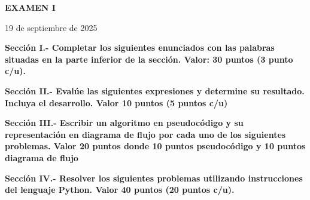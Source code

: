 \documentclass[10pt,addpoints]{exam}
\begin{document}
\begin{center}
  \sffamily\textbf{EXAMEN I}
\end{center}
\begin{flushright}
19 de septiembre de 2025
\end{flushright}

\begin{questions}
\begin{EnvFullwidth}
  \sffamily\textbf{Sección I.- Completar los siguientes enunciados con las
  palabras situadas en la parte inferior de la sección. Valor: 30 puntos
  (3 punto c/u).}
\end{EnvFullwidth}













\end{questions}

\begin{questions}
\begin{EnvFullwidth}
  \sffamily\textbf{Sección II.- Evalúe las siguientes expresiones y
  determine su resultado. Incluya el desarrollo. Valor 10 puntos (5 puntos
  c/u)}
\end{EnvFullwidth}





\end{questions}

\newpage

\begin{questions}
\begin{EnvFullwidth}
  \sffamily\textbf{Sección III.- Escribir un algoritmo en pseudocódigo y su
  representación en diagrama de flujo por cada uno de los siguientes
  problemas. Valor 20 puntos donde 10 puntos pseudocódigo y 10 puntos
  diagrama de flujo}
\end{EnvFullwidth}


%
%

\end{questions}

\begin{questions}
\begin{EnvFullwidth}
  \sffamily\textbf{Sección IV.- Resolver los siguientes problemas utilizando
  instrucciones del lenguaje Python. Valor 40 puntos (20 puntos c/u).}
\end{EnvFullwidth}



%

\end{questions}
\end{document}
